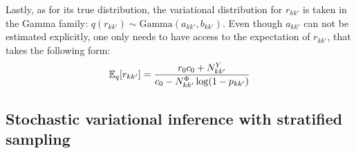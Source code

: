 Lastly, as for its true distribution, the variational distribution for $r_{kk'}$ is taken in the Gamma family:  $q(r_{kk'}) \sim \textrm{Gamma}(a_{kk'},b_{kk'})$. Even though $a_{kk'}$ can not be estimated explicitly, one only needs to have access to the expectation of $r_{kk'}$, that takes the following form:
\[
\mathbb{E}_{q}[r_{kk'}] = \frac{r_0c_0+N^Y_{kk'}}{c_0  -N^\Phi_{kk'}\log(1-p_{kk'})}
\]
%

\subsection{Stochastic variational inference with stratified sampling}

